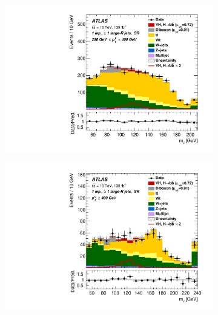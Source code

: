 \begin{figure}[!htbp]
\begin{subfigure}{.4\textwidth}
    \includegraphics[width=\textwidth]{chapters/6.vhbb_boosted/figs/Region_BMin250_BMax400_incFat1_Fat1_Y6051_DSRnoaddbjetsr_T2_L1_distmBB_GlobalFit_unconditionnal_mu1.pdf}
  \end{subfigure}%
  \begin{subfigure}{.4\textwidth}
    \includegraphics[width=\textwidth]{chapters/6.vhbb_boosted/figs/Region_BMin400_incFat1_Fat1_Y6051_DSRnoaddbjetsr_T2_L1_distmBB_GlobalFit_unconditionnal_mu1.pdf}
  \end{subfigure}
  \begin{subfigure}{.4\textwidth}

\end{subfigure}
\end{figure}
